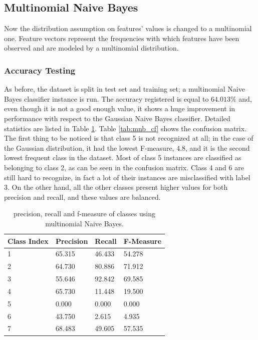\documentclass[a4paper, 10pt]{article}
\begin{document}
    
\subsection{Multinomial Naive Bayes}

Now the distribution assumption on features' values is changed to a multinomial one. Feature vectors represent the frequencies with which features have been observed and are modeled by a multinomial distribution.

\subsubsection{Accuracy Testing}
As before, the dataset is split in test set and training set; a multinomial Naive Bayes classifier instance is run. The accuracy registered is equal to $64.013\%$ and, even though it is not a good enough value, it shows a huge improvement in performance with respect to the Gaussian Naive Bayes classifier. Detailed statistics are listed in Table \ref{tab:mnb_test_pr}. Table \ref{tab:mnb_cf} shows the confusion matrix. The first thing to be noticed is that class 5 is not recognized at all; in the case of the Gaussian distribution, it had the lowest F-measure, $4.8$, and it is the second lowest frequent class in the dataset. Most of class 5 instances are classified as belonging to class 2, as can be seen in the confusion matrix. Class 4 and 6 are still hard to recognize, in fact a lot of their instances are misclassified with label 3. On the other hand, all the other classes present higher values for both precision and recall, and these values are balanced.

\begin{table}[H]
\centering
\begin{tabular}{|l|l|l|l|}
\hline
\textbf{Class Index} & \textbf{Precision} & \textbf{Recall} & \textbf{F-Measure}\\\hline
1 & 65.315 & 46.433& 54.278\\\hline
2 & 64.730 & 80.886& 71.912\\\hline
3 & 55.646 & 92.842& 69.585\\\hline
4 & 65.730 & 11.448& 19.500\\\hline
5 & 0.000 & 0.000& 0.000\\\hline
6 & 43.750 & 2.615& 4.935\\\hline
7 & 68.483 & 49.605& 57.535\\\hline
\end{tabular}
\caption{precision, recall and f-measure of classes using multinomial Naive Bayes.}
\label{tab:mnb_test_pr}
\end{table}
\end{document}
